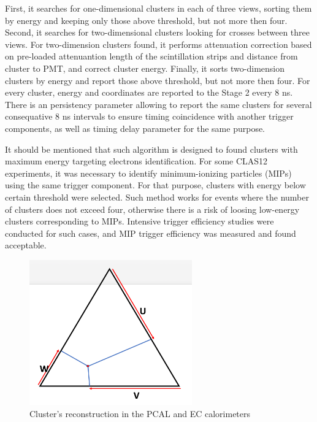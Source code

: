 First, it searches for one-dimensional clusters in each of three views, sorting them by energy and keeping only those above threshold, but not more then four. Second, it searches for two-dimensional clusters looking for crosses between three views. For two-dimension clusters found, it performs attenuation correction based on pre-loaded attenuantion length of the scintillation strips and distance from cluster to PMT, and correct cluster energy. Finally, it sorts two-dimension clusters by energy and report those above threshold, but not more then four. For every cluster, energy and coordinates are reported to the Stage 2 every 8 ns. There is an persistency parameter allowing to report the same clusters for several consequative 8 ns intervals to ensure timing coincidence with another trigger components, as well as timing delay parameter for the same purpose.

It should be mentioned that such algorithm is designed to found clusters with maximum energy targeting electrons identification. For some CLAS12 experiments, it was necessary to identify minimum-ionizing particles (MIPs) using the same trigger component. For that purpose, clusters with energy below certain threshold were selected. Such method works for events where the number of clusters does not exceed four, otherwise there is a risk of loosing low-energy clusters corresponding to MIPs. Intensive trigger efficiency studies were conducted for such cases, and MIP trigger efficiency was measured and found acceptable.

\begin{figure}[htp]
	\begin{center}
		\centering
		\includegraphics[width=7cm]{img/PCAL-EC.pdf}
		\caption{Cluster's reconstruction in the PCAL and EC calorimeters}
		\label{fig:PCAL}
	\end{center}
\end{figure} 


